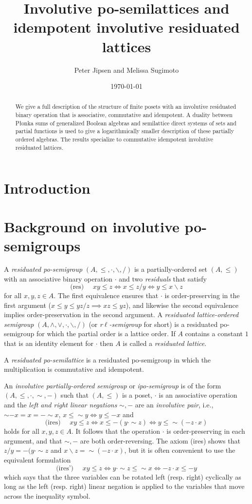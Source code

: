 \documentclass[12pt]{amsart}
\title[Involutive po-semilattices]{Involutive po-semilattices and idempotent involutive residuated lattices}
\author{Peter Jipsen and Melissa Sugimoto}
\date{\today}%
\newcommand{\rd}{{/}}
\newcommand{\ld}{{\backslash}}
\renewcommand{\ln}{{\sim}}
\newcommand{\rn}{{-}}
\begin{document}
\begin{abstract}
We give a full description of the structure of finite
posets with an involutive residuated binary operation that is associative, commutative and idempotent.
A duality between P\l onka sums of generalized Boolean algebras
and semilattice direct systems of sets and partial functions
is used to give a logarithmically smaller description of these partially
ordered algebras. The results specialize to commutative idempotent
involutive residuated lattices.
\end{abstract}

\maketitle

\section{Introduction}


\section{Background on involutive po-semigroups}
A \emph{residuated po-semigroup} $(A,\le,\cdot,\ld,\rd)$ is a partially-ordered set $(A,\le)$ with an associative binary operation $\cdot$ and two \emph{residuals} that satisfy
$$
\text{(res) }\quad xy\le z\iff x\le z\rd y\iff y\le x\ld z
$$
for all $x,y,z\in A$.
The first equivalence ensures that $\cdot$ is order-preserving in the first argument ($x\le y\le yz\rd z\implies xz\le yz$), and likewise the second equivalence implies order-preservation in the second argument. A \emph{residuated lattice-ordered semigroup} $(A,\wedge,\vee,\cdot,\ld,\rd)$ (or \emph{r$\ell$-semigroup} for short) is a residuated po-semigroup for which the partial order is
a lattice order. If $A$ contains a constant $1$ that is an identity element for $\cdot$ then $A$ is
called a \emph{residuated lattice}.

A \emph{residuated po-semilattice} is a residuated po-semigroup in which the multiplication is commutative and idempotent.

An \emph{involutive partially-ordered semigroup} or \emph{ipo-semigroup} is of the form $(A,\le,\cdot,\ln,\rn)$ such that $(A,\le)$ is a poset, $\cdot$ is an associative operation and the \emph{left and right linear negations} $\sim,-$ are an \emph{involutive pair}, i.e., $\ln\rn x=x=\rn\ln x$, $x\le \ln y\iff y\le\rn x$ and
$$
\text{(ires) }\quad xy\le z\iff x\le \rn(y\cdot\ln z)\iff y\le \ln(\rn z\cdot x)
$$
holds for all $x,y,z\in A$.
It follows that the operation $\cdot$ is order-preserving in each argument, and that $\ln,\rn$ are both order-reversing. The axiom (ires) shows that $z/y=\rn(y\cdot \ln z$ and $x\ld z=\ln(\rn z\cdot x)$, but it is often convenient to use the equivalent formulation
$$
\text{(ires') }\quad xy\le z\iff y\cdot\ln z\le \ln x\iff \rn z\cdot x\le \rn y
$$
which says that the three variables can be rotated left (resp. right) cyclically as long as the left (resp. right) linear negation is applied to the variables that move across the inequality symbol.
\end{document}
